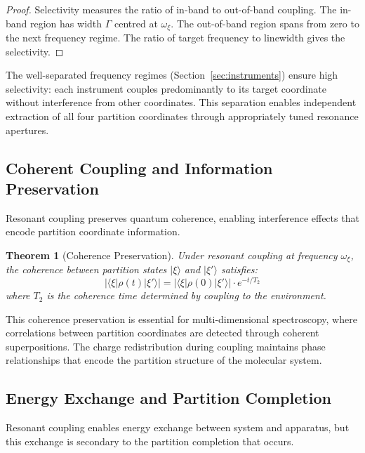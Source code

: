 \documentclass[twocolumn,10pt,a4paper]{article}
\newtheorem{theorem}{Theorem}[section]
\theoremstyle{definition}
\theoremstyle{remark}
\begin{document}
\begin{proof}
Selectivity measures the ratio of in-band to out-of-band coupling. The in-band region has width $\Gamma$ centred at $\omega_\xi$. The out-of-band region spans from zero to the next frequency regime. The ratio of target frequency to linewidth gives the selectivity.
\end{proof}

The well-separated frequency regimes (Section~\ref{sec:instruments}) ensure high selectivity: each instrument couples predominantly to its target coordinate without interference from other coordinates. This separation enables independent extraction of all four partition coordinates through appropriately tuned resonance apertures.

\subsection{Coherent Coupling and Information Preservation}

Resonant coupling preserves quantum coherence, enabling interference effects that encode partition coordinate information.

\begin{theorem}[Coherence Preservation]
\label{thm:coherence}
Under resonant coupling at frequency $\omega_\xi$, the coherence between partition states $|\xi\rangle$ and $|\xi'\rangle$ satisfies:
\begin{equation}
|\langle \xi | \rho(t) | \xi' \rangle| = |\langle \xi | \rho(0) | \xi' \rangle| \cdot e^{-t/T_2}
\end{equation}
where $T_2$ is the coherence time determined by coupling to the environment.
\end{theorem}

This coherence preservation is essential for multi-dimensional spectroscopy, where correlations between partition coordinates are detected through coherent superpositions. The charge redistribution during coupling maintains phase relationships that encode the partition structure of the molecular system.

\subsection{Energy Exchange and Partition Completion}

Resonant coupling enables energy exchange between system and apparatus, but this exchange is secondary to the partition completion that occurs.
\end{document}
